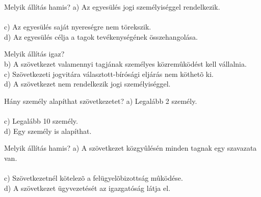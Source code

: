 \begin{frame}


\begin{tcolorbox}[title={79. Kérdés}]
Melyik állítás hamis?
\tcblower
a) Az egyesülés jogi személyiséggel rendelkezik.\\
\\
c) Az egyesülés saját nyereségre nem törekszik.\\
d) Az egyesülés célja a tagok tevékenységének összehangolása.
\end{tcolorbox}

\begin{tcolorbox}[title={80. Kérdés}]
Melyik állítás igaz?
\tcblower
{}\\
b) A szövetkezet valamennyi tagjának személyes közremûködést kell vállalnia.\\
c) Szövetkezeti jogvitára választott-bírósági eljárás nem köthetõ ki.\\
d) A szövetkezet nem rendelkezik jogi személyiséggel.
\end{tcolorbox}

\begin{tcolorbox}[title={81. Kérdés}]
Hány személy alapíthat szövetkezetet?
\tcblower
a) Legalább 2 személy.\\
\\
c) Legalább 10 személy.\\
d) Egy személy is alapíthat.
\end{tcolorbox}

\begin{tcolorbox}[title={82. Kérdés}]
Melyik állítás hamis?
\tcblower
a) A szövetkezet közgyûlésén minden tagnak egy szavazata van.\\
\\
c) Szövetkezetnél kötelezõ a felügyelõbizottság mûködése. \\
d) A szövetkezet ügyvezetését az igazgatóság látja el.
\end{tcolorbox}

\end{frame}


